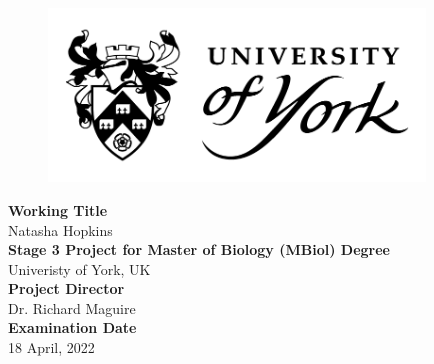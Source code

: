 \documentclass[
  12pt,
]{article}
\author{}
\date{\vspace{-2.5em}}
\begin{document}
\captionsetup{justification=raggedright,singlelinecheck=false}

\begin{center}
\begin{figure}[h!]
\centering
  \includegraphics[width=10cm]{../images/uoy_logo.png}
  \label{}
\end{figure}
\vspace*{2\baselineskip}
\Large{\textbf{Working Title}}\\
Natasha Hopkins\\
\vspace*{2\baselineskip}
\Large{\textbf{Stage 3 Project for Master of Biology (MBiol) Degree}}\\
\Large{Univeristy of York, UK}\\
\vspace*{2\baselineskip}
\Large{\textbf{Project Director}}\\
Dr. Richard Maguire\\
\vspace*{2\baselineskip}
\Large{\textbf{Examination Date}}\\
18 April, 2022
\end{center}

\hypersetup{linkcolor = black}
\newpage
\tableofcontents
\hypersetup{linkcolor = teal}
\end{document}
